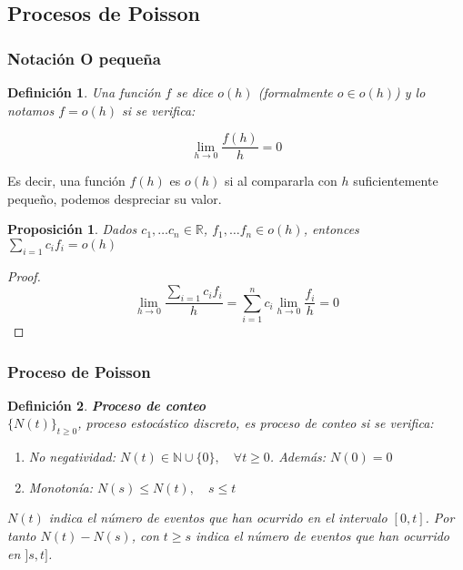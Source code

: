 \documentclass[a4paper,10pt]{scrartcl}
\newtheorem{mydefn}{Definición}
\newtheorem{fact}{Proposición}
\numberwithin{equation}{section}
\begin{document}
\subsection{Procesos de Poisson}

\subsubsection{Notación O pequeña}
  \begin{mydefn} 
  Una función $f$ se dice $o(h)$ (formalmente $o\in o(h)$) y lo notamos $f=o(h)$ si se verifica:
  
  \[\lim_{h\rightarrow 0} \frac{f(h)}{h} = 0\]
  \end{mydefn}

  Es decir, una función $f(h)$ es $o(h)$ si al compararla con $h$ suficientemente pequeño, podemos despreciar su
  valor.

  \begin{fact}
  Dados $c_1, \ldots c_n \in \mathbb{R}$, $f_1, \ldots f_n \in o(h)$, entonces $\sum_{i=1} c_i f_i = o(h)$
  \end{fact}

  \begin{proof}
  \[\lim_{h\rightarrow 0} \frac{\sum_{i=1} c_i f_i}{h} = \sum_{i=1}^n{c_i \lim_{h\rightarrow 0} \frac{f_i}{h}} = 0\]
  \end{proof}

\subsubsection{Proceso de Poisson}

  \begin{mydefn} \textbf{Proceso de conteo}\\
  $\{N(t)\}_{t\ge 0}$, proceso estocástico discreto, es proceso de conteo si se verifica:
  \begin{enumerate}
    \item No negatividad: $N(t) \in \mathbb{N}\cup\{0\}, \quad \forall t\ge 0$. Además: $N(0)=0$
    \item Monotonía: $N(s) \le N(t), \quad s \le t$
  \end{enumerate}

  $N(t)$ indica el número de eventos que han ocurrido en el intervalo $[0,t]$. Por tanto $N(t)- N(s)$, con $t\ge s$
  indica el número de eventos que han ocurrido en $]s,t]$.
  \end{mydefn}
\end{document}
